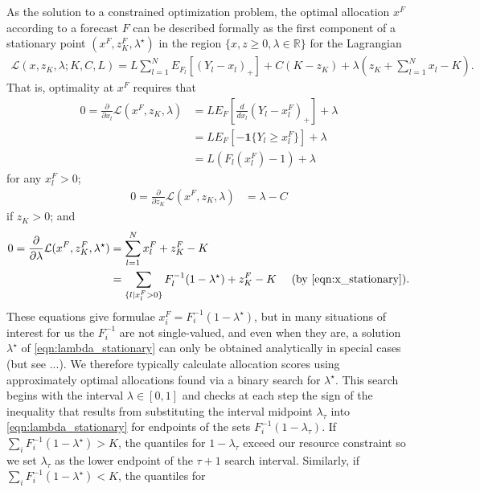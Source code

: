 \documentclass{article}
\begin{document}
As the solution to a constrained optimization problem, the optimal allocation $x^F$ according to a forecast $F$ can be described formally as the first component of a stationary point $(x^F, z_K^F, \lambda^{\star})$ in the region $\{x, z \geq 0, \lambda \in \mathbb{R}\}$ for the Lagrangian 
\begin{align}
\mathcal{L}(x, z_K, \lambda; K, C, L) = L\sum_{l=1}^{N} E_{F_l}[(Y_l - x_l)_{+}] + C(K-z_K) + \lambda\left(z_K + \sum_{l=1}^{N} x_l - K\right).
\end{align}
That is, optimality at $x^F$ requires that
\begin{align}
0 = \frac{\partial}{\partial x_l} \mathcal{L}(x^F, z_K, \lambda) &= L E_F \left[\frac{d}{dx_l}(Y_l - x_l^F)_{+}\right] + \lambda \\
& = L E_F \left[-\mathbf{1}\{Y_l \geq x_l^F\}\right] + \lambda \\
& = L(F_l(x_l^F)-1) + \lambda \label{eqn:x_stationary}
\end{align}
for any $x_l^F > 0$;
\begin{align}
0 = \frac{\partial}{\partial z_K} \mathcal{L}(x^F, z_K, \lambda) &= \lambda - C
\end{align}
if $z_K>0$; and
\begin{align}
0 = \frac{\partial {} }{\partial {\lambda}} \mathcal{L}(x^F, z_K^F, \lambda^{\star}) &= \sum_{l=1}^{N} x_l^F + z_K^F - K\\
& = \sum_{\{l | x_l^F > 0\}} F_{l}^{-1}(1-\lambda^{\star}) + z_K^F - K \quad \text{ (by \eqref{eqn:x_stationary})}. \label{eqn:lambda_stationary}
\end{align}
These equations give formulae $x_i^F = F_i^{-1}(1-\lambda^{\star})$, but in many situations of interest for us the $F_i^{-1}$ are not single-valued, and even 
when they are, a solution $\lambda^{\star}$ of \eqref{eqn:lambda_stationary} can only be obtained analytically in special cases (but see ...). We therefore typically calculate allocation scores using approximately optimal allocations found via a binary search for $\lambda^{\star}$.  This search begins with the interval $\lambda \in [0,1]$ and 
checks at each step the sign of the inequality that results from substituting the interval midpoint $\lambda_{\tau}$ into \eqref{eqn:lambda_stationary} for endpoints of the sets $F_i^{-1}(1-\lambda_{\tau})$.  If $\sum_{i} F_{i}^{-1}(1-\lambda^{\star}) > K$, the quantiles for $1-\lambda_{\tau}$ exceed our resource constraint so we set $\lambda_{\tau}$ as the lower endpoint of the $\tau + 1$ search interval.  Similarly, if $\sum_{i} F_{i}^{-1}(1-\lambda^{\star}) < K$, the quantiles for 
\end{document}

